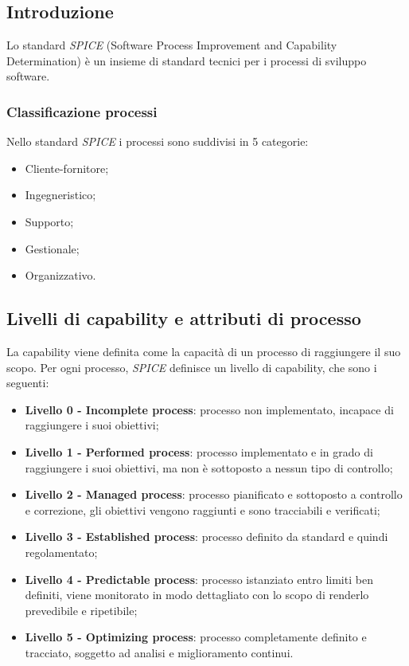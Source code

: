 \subsection{Introduzione}
Lo standard \textit{SPICE} (Software Process Improvement and Capability Determination) è un insieme di
standard tecnici per i processi di sviluppo software.

\subsubsection{Classificazione processi}
Nello standard \textit{SPICE} i processi sono suddivisi in 5 categorie:
\begin{itemize}
	\item Cliente-fornitore;
	\item Ingegneristico;
	\item Supporto;
	\item Gestionale;
	\item Organizzativo.
\end{itemize}

\subsection{Livelli di capability e attributi di processo}
La capability viene definita come la capacità di un processo di raggiungere il suo scopo. Per ogni processo, \textit{SPICE} definisce un livello di capability, che sono i seguenti:
\begin{itemize}
	\item \textbf{Livello 0 - Incomplete process}: processo non implementato, incapace di raggiungere i suoi
	obiettivi;
	\item \textbf{Livello 1 - Performed process}: processo implementato e in grado di raggiungere i suoi obiettivi,
	ma non è sottoposto a nessun tipo di controllo;
	\item \textbf{Livello 2 - Managed process}: processo pianificato e sottoposto a controllo e correzione, gli
	obiettivi vengono raggiunti e sono tracciabili e verificati;
	\item \textbf{Livello 3 - Established process}: processo definito da standard e quindi regolamentato;
	\item \textbf{Livello 4 - Predictable process}: processo istanziato entro limiti ben definiti, viene monitorato
	in modo dettagliato con lo scopo di renderlo prevedibile e ripetibile;
	\item \textbf{Livello 5 - Optimizing process}: processo completamente definito e tracciato, soggetto ad analisi
	e miglioramento continui.
\end{itemize}
 
